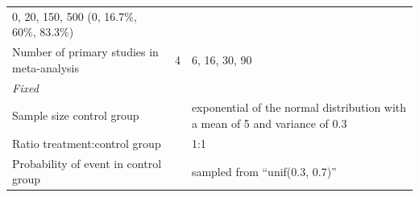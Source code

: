 \documentclass[
  english,
  doc,floatsintext,draftall]{apa6}
\begin{document}
\begin{longtable}[]{@{}lll@{}}
\begin{minipage}[t]{0.43\columnwidth}
0, 20, 150, 500 (0, 16.7\%, 60\%, 83.3\%)\strut
\end{minipage}\tabularnewline
\begin{minipage}[t]{0.37\columnwidth}\raggedright
Number of primary studies in meta-analysis\strut
\end{minipage} & \begin{minipage}[t]{0.12\columnwidth}\raggedright
4\strut
\end{minipage} & \begin{minipage}[t]{0.43\columnwidth}\raggedright
6, 16, 30, 90\strut
\end{minipage}\tabularnewline
\begin{minipage}[t]{0.37\columnwidth}\raggedright
\emph{Fixed}\strut
\end{minipage} & \begin{minipage}[t]{0.12\columnwidth}\raggedright
\strut
\end{minipage} & \begin{minipage}[t]{0.43\columnwidth}\raggedright
\strut
\end{minipage}\tabularnewline
\begin{minipage}[t]{0.37\columnwidth}\raggedright
Sample size control group\strut
\end{minipage} & \begin{minipage}[t]{0.12\columnwidth}\raggedright
\strut
\end{minipage} & \begin{minipage}[t]{0.43\columnwidth}\raggedright
exponential of the normal distribution with a mean of 5 and variance of 0.3\strut
\end{minipage}\tabularnewline
\begin{minipage}[t]{0.37\columnwidth}\raggedright
Ratio treatment:control group\strut
\end{minipage} & \begin{minipage}[t]{0.12\columnwidth}\raggedright
\strut
\end{minipage} & \begin{minipage}[t]{0.43\columnwidth}\raggedright
1:1\strut
\end{minipage}\tabularnewline
\begin{minipage}[t]{0.37\columnwidth}\raggedright
Probability of event in control group\strut
\end{minipage} & \begin{minipage}[t]{0.12\columnwidth}\raggedright
\strut
\end{minipage} & \begin{minipage}[t]{0.43\columnwidth}\raggedright
sampled from \enquote{unif(0.3, 0.7)}\strut
\end{minipage}\tabularnewline
\bottomrule
\end{longtable}
\end{document}
